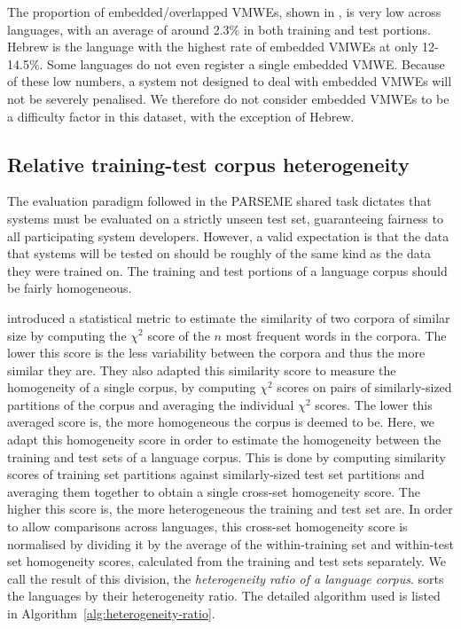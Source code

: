 \documentclass[output=paper
,modfonts
,nonflat,draftmode]{langsci/langscibook}
\begin{document}
The proportion of embedded/overlapped VMWEs, shown in , is very low across languages, with an average of around 2.3\% in both training and test portions. Hebrew is the language with the highest rate of embedded VMWEs at only 12-14.5\%.  Some languages do not even register a single embedded VMWE. Because of these low numbers, a system not designed to deal with embedded VMWEs will not be severely penalised. We therefore do not consider embedded VMWEs to be a difficulty factor in this dataset, with the exception of Hebrew.

\subsection{Relative training-test corpus heterogeneity}

The evaluation paradigm followed in the PARSEME shared task dictates that systems must be evaluated on a strictly unseen test set, guaranteeing fairness to all participating system developers. However, a valid expectation is that the data that systems will be tested on should be roughly of the same kind as the data they were trained on. The training and test portions of a language corpus should be fairly homogeneous.

\citet{Kilgarriff1998} introduced a statistical metric to estimate the similarity of two corpora of similar size by computing the $\chi^{2}$ score of the $n$ most frequent words in the corpora. The lower this score is the less variability between the corpora and thus the more similar they are. They also adapted this similarity score to measure the homogeneity of a single corpus, by computing $\chi^{2}$ scores on pairs of similarly-sized partitions of the corpus and averaging the individual $\chi^{2}$ scores. The lower this averaged score is, the more homogeneous the corpus is deemed to be. Here, we adapt this homogeneity score in order to estimate the homogeneity between the training and test sets of a language corpus. This is done by computing similarity scores of training set partitions against similarly-sized test set partitions and averaging them together to obtain a single cross-set homogeneity score. The higher this score is, the more heterogeneous the training and test set are. In order to allow comparisons across languages, this cross-set homogeneity score is normalised by dividing it by the average of the within-training set and within-test set homogeneity scores, calculated from the training and test sets separately. We call the result of this division, the \emph{heterogeneity ratio of a language corpus}.  sorts the languages by their heterogeneity ratio. The detailed algorithm used is listed in Algorithm~\ref{alg:heterogeneity-ratio}.
\end{document}
